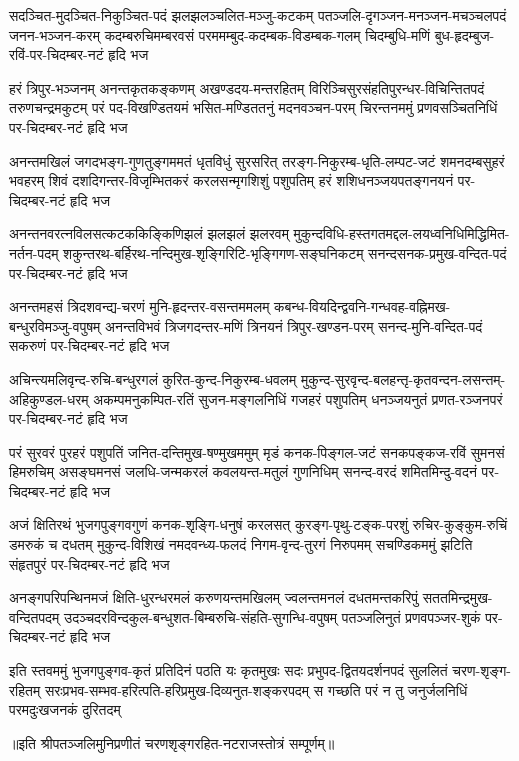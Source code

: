 \setlength{\shlokaspaceskip}{4pt}
\fourlineindentedshloka
{सदञ्चित-मुदञ्चित-निकुञ्चित-पदं झलझलञ्चलित-मञ्जु-कटकम्}
{पतञ्जलि-दृगञ्जन-मनञ्जन-मचञ्चलपदं जनन-भञ्जन-करम्}
{कदम्बरुचिमम्बरवसं परममम्बुद-कदम्बक-विडम्बक-गलम्}
{चिदम्बुधि-मणिं बुध-हृदम्बुज-रविं-पर-चिदम्बर-नटं हृदि भज} %

\fourlineindentedshloka
{हरं त्रिपुर-भञ्जनम् अनन्तकृतकङ्कणम् अखण्डदय-मन्तरहितम्}
{विरिञ्चिसुरसंहतिपुरन्धर-विचिन्तितपदं तरुणचन्द्रमकुटम्}
{परं पद-विखण्डितयमं भसित-मण्डिततनुं मदनवञ्चन-परम्}
{चिरन्तनममुं प्रणवसञ्चितनिधिं पर-चिदम्बर-नटं हृदि भज} %

\fourlineindentedshloka
{अनन्तमखिलं जगदभङ्ग-गुणतुङ्गममतं धृतविधुं सुरसरित्}
{तरङ्ग-निकुरम्ब-धृति-लम्पट-जटं शमनदम्बसुहरं भवहरम्}
{शिवं दशदिगन्तर-विजृम्भितकरं करलसन्मृगशिशुं पशुपतिम्}
{हरं शशिधनञ्जयपतङ्गनयनं पर-चिदम्बर-नटं हृदि भज} %

\fourlineindentedshloka
{अनन्तनवरत्नविलसत्कटककिङ्किणिझलं झलझलं झलरवम्}
{मुकुन्दविधि-हस्तगतमद्दल-लयध्वनिधिमिद्धिमित-नर्तन-पदम्}
{शकुन्तरथ-बर्हिरथ-नन्दिमुख-शृङ्गिरिटि-भृङ्गिगण-सङ्घनिकटम्}
{सनन्दसनक-प्रमुख-वन्दित-पदं पर-चिदम्बर-नटं हृदि भज} %

\fourlineindentedshloka
{अनन्तमहसं त्रिदशवन्द्य-चरणं मुनि-हृदन्तर-वसन्तममलम्}
{कबन्ध-वियदिन्द्ववनि-गन्धवह-वह्निमख-बन्धुरविमञ्जु-वपुषम्}
{अनन्तविभवं त्रिजगदन्तर-मणिं त्रिनयनं त्रिपुर-खण्डन-परम्}
{सनन्द-मुनि-वन्दित-पदं सकरुणं पर-चिदम्बर-नटं हृदि भज} %

\fourlineindentedshloka
{अचिन्त्यमलिवृन्द-रुचि-बन्धुरगलं कुरित-कुन्द-निकुरम्ब-धवलम्}
{मुकुन्द-सुरवृन्द-बलहन्तृ-कृतवन्दन-लसन्तम्-अहिकुण्डल-धरम्}
{अकम्पमनुकम्पित-रतिं सुजन-मङ्गलनिधिं गजहरं पशुपतिम्}
{धनञ्जयनुतं प्रणत-रञ्जनपरं पर-चिदम्बर-नटं हृदि भज} %

\fourlineindentedshloka
{परं सुरवरं पुरहरं पशुपतिं जनित-दन्तिमुख-षण्मुखममुम्}
{मृडं कनक-पिङ्गल-जटं सनकपङ्कज-रविं सुमनसं हिमरुचिम्}
{असङ्घमनसं जलधि-जन्मकरलं कवलयन्त-मतुलं गुणनिधिम्}
{सनन्द-वरदं शमितमिन्दु-वदनं पर-चिदम्बर-नटं हृदि भज} %

\fourlineindentedshloka
{अजं क्षितिरथं भुजगपुङ्गवगुणं कनक-शृङ्गि-धनुषं करलसत्}
{कुरङ्ग-पृथु-टङ्क-परशुं रुचिर-कुङ्कुम-रुचिं डमरुकं च दधतम्}
{मुकुन्द-विशिखं नमदवन्ध्य-फलदं निगम-वृन्द-तुरगं निरुपमम्}
{सचण्डिकममुं झटिति संहृतपुरं पर-चिदम्बर-नटं हृदि भज} %

\fourlineindentedshloka
{अनङ्गपरिपन्थिनमजं क्षिति-धुरन्धरमलं करुणयन्तमखिलम्}
{ज्वलन्तमनलं दधतमन्तकरिपुं सततमिन्द्रमुख-वन्दितपदम्}
{उदञ्चदरविन्दकुल-बन्धुशत-बिम्बरुचि-संहति-सुगन्धि-वपुषम्}
{पतञ्जलिनुतं प्रणवपञ्जर-शुकं पर-चिदम्बर-नटं हृदि भज} %

\fourlineindentedshloka
{इति स्तवममुं भुजगपुङ्गव-कृतं प्रतिदिनं पठति यः कृतमुखः}
{सदः प्रभुपद-द्वितयदर्शनपदं सुललितं चरण-शृङ्ग-रहितम्}
{सरःप्रभव-सम्भव-हरित्पति-हरिप्रमुख-दिव्यनुत-शङ्करपदम्}
{स गच्छति परं न तु जनुर्जलनिधिं परमदुःखजनकं दुरितदम्} %

॥इति श्रीपतञ्जलिमुनिप्रणीतं चरणशृङ्गरहित-नटराजस्तोत्रं सम्पूर्णम्॥
\setlength{\shlokaspaceskip}{24pt}